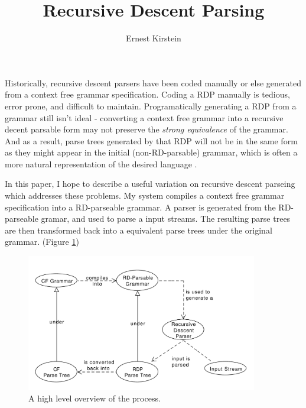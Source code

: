 \documentclass[11pt]{article}
\begin{document}
\title{Recursive Descent Parsing}
\author{Ernest Kirstein}
\maketitle

Historically, recursive descent parsers have been coded manually or else generated from 
a context free grammar specification. \cite{lewis, formal_langs} 
Coding a RDP manually is tedious, error prone, and difficult to maintain.
Programatically generating a RDP from a grammar
still isn't ideal - converting a context free grammar into
a recursive decent parsable form may not preserve the {\em strong equivalence} of the grammar.
And as a result, parse trees generated by that RDP will not be in the same form
as they might appear in the initial (non-RD-parsable) grammar, which is often a more 
natural representation of the desired language \cite{compiler}.

In this paper, I hope to describe a useful variation on recursive descent parseing
which addresses these problems. My system compiles a context free grammar 
specification into a RD-parseable grammar.
A parser is generated from the RD-parseable gramar,
and used to parse a input streams. 
The resulting parse trees are then transformed back into a equivalent
parse trees under the original grammar. (Figure \ref{fig:high_level})

\begin{figure}[h!]
    \centering
    \includegraphics[width=0.9\textwidth,natwidth=1,natheight=1]{high_level.pdf}
    \caption{A high level overview of the process.}
    \label{fig:high_level}
\end{figure}

\clearpage
\end{document}
